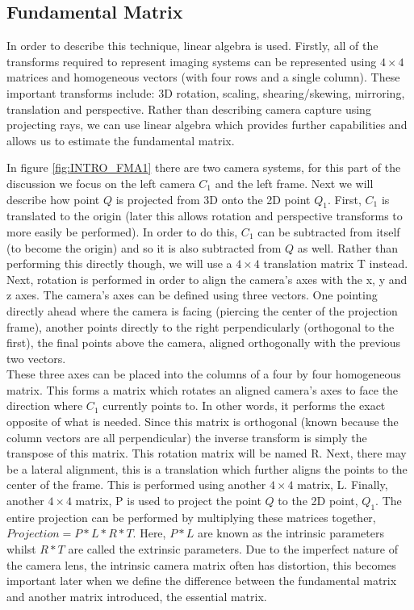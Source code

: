 
\subsection{Fundamental Matrix}

In order to describe this technique, linear algebra is used. Firstly, all of the transforms required to represent imaging systems can be represented using $4 \times 4$ matrices and homogeneous vectors (with four rows and a single column). These important transforms include: 3D rotation, scaling, shearing/skewing, mirroring, translation and perspective. Rather than describing camera capture using projecting rays, we can use linear algebra which provides further capabilities and allows us to estimate the fundamental matrix. 

In figure \ref{fig:INTRO_FMA1} there are two camera systems, for this part of the discussion we focus on the left camera $C_{1}$ and the left frame. Next we will describe how point $Q$ is projected from 3D onto the 2D point $Q_{1}$. First, $C_{1}$ is translated to the origin (later this allows rotation and perspective transforms to more easily be performed). In order to do this, $C_{1}$ can be subtracted from itself (to become the origin) and so it is also subtracted from $Q$ as well. Rather than performing this directly though, we will use a $4 \times 4$ translation matrix T instead. Next, rotation is performed in order to align the camera's axes with the x, y and z axes. The camera's axes can be defined using three vectors. One pointing directly ahead where the camera is facing (piercing the center of the projection frame), another points directly to the right perpendicularly (orthogonal to the first), the final points above the camera, aligned orthogonally with the previous two vectors. \\

These three axes can be placed into the columns of a four by four homogeneous matrix. This forms a matrix which rotates an aligned camera's axes to face the direction where $C_1$ currently points to. In other words, it performs the exact opposite of what is needed. Since this matrix is orthogonal (known because the column vectors are all perpendicular) the inverse transform is simply the transpose of this matrix. This rotation matrix will be named R. Next, there may be a lateral alignment, this is a translation which further aligns the points to the center of the frame. This is performed using another $4 \times 4$ matrix, L. Finally, another $4 \times 4$ matrix, P is used to project the point $Q$ to the 2D point, $Q_1$. The entire projection can be performed by multiplying these matrices together, $Projection = P * L * R * T$. Here, $P * L$ are known as the intrinsic parameters whilst $R * T$ are called the extrinsic parameters. Due to the imperfect nature of the camera lens, the intrinsic camera matrix often has distortion, this becomes important later when we define the difference between the fundamental matrix and another matrix introduced, the essential matrix.

